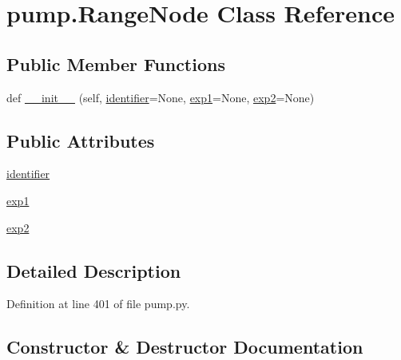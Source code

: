 \hypertarget{classpump_1_1_range_node}{}\section{pump.\+Range\+Node Class Reference}
\label{classpump_1_1_range_node}
\subsection*{Public Member Functions}
\begin{DoxyCompactItemize}
\item 
def \hyperlink{classpump_1_1_range_node_a58e85945a5a6e2f899e8243422c871e3}{\+\_\+\+\_\+init\+\_\+\+\_\+} (self, \hyperlink{classpump_1_1_range_node_ae75b9f31ba8c3bd048cf09b22035efa0}{identifier}=None, \hyperlink{classpump_1_1_range_node_acbb59f8c5e23d23563ca03f21574ce63}{exp1}=None, \hyperlink{classpump_1_1_range_node_afe153ee472b121652a51c62c1522cc13}{exp2}=None)
\end{DoxyCompactItemize}
\subsection*{Public Attributes}
\begin{DoxyCompactItemize}
\item 
\hyperlink{classpump_1_1_range_node_ae75b9f31ba8c3bd048cf09b22035efa0}{identifier}
\item 
\hyperlink{classpump_1_1_range_node_acbb59f8c5e23d23563ca03f21574ce63}{exp1}
\item 
\hyperlink{classpump_1_1_range_node_afe153ee472b121652a51c62c1522cc13}{exp2}
\end{DoxyCompactItemize}


\subsection{Detailed Description}


Definition at line 401 of file pump.\+py.



\subsection{Constructor \& Destructor Documentation}
